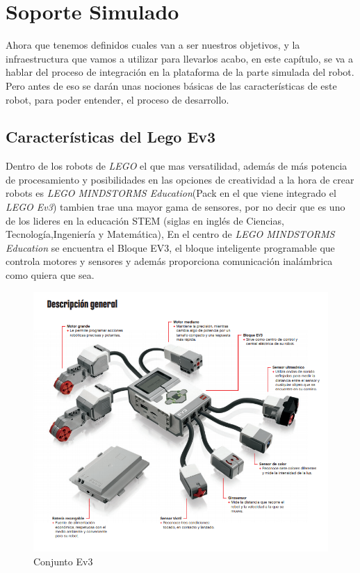 \chapter{Soporte Simulado}
\label{chap:simulado}
Ahora que tenemos definidos cuales van a ser nuestros objetivos, y la infraestructura que vamos a utilizar para llevarlos acabo, en este capítulo, se va a hablar del proceso de integración en la plataforma de la parte simulada del robot. Pero antes de eso se darán unas nociones básicas de las características de este robot, para poder entender, el proceso de desarrollo. 
\section{Características del Lego Ev3}
\label{sec:caracteristicas}
Dentro de los robots de \textit{LEGO} el que mas versatilidad, además de más potencia de procesamiento y posibilidades en las opciones de creatividad a la hora de crear robots es \textit{LEGO MINDSTORMS Education}(Pack en el que viene integrado el \textit{LEGO Ev3}) tambien trae una mayor gama de sensores, por no decir que es uno de los lideres en la educación STEM (siglas en inglés de Ciencias, Tecnología,Ingeniería y Matemática), En el centro de \textit{LEGO MINDSTORMS Education} se encuentra el Bloque EV3, el bloque inteligente programable que controla motores y sensores y además proporciona comunicación inalámbrica como quiera que sea.
 \begin{figure}[H]
    \centering
    \includegraphics[scale=0.7]{img/partes.png}
    \caption{Conjunto Ev3} \label{fig:partes}
\end{figure}
